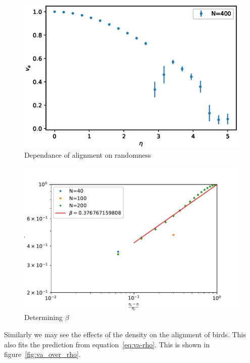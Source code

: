 \documentclass[twoside,twocolumn]{article}
\begin{document}
\begin{figure}[!htb]
  \centering
  \includegraphics[width=\columnwidth]{va_over_eta}
  \caption{Dependance of alignment on randomness}
  \label{fig:va_over_eta}
\end{figure}


\begin{figure}[!htb]
	\centering
	\includegraphics[width=\columnwidth]{va_over_etac_minus_eta_over_etac}
	\caption{Determining $\beta$}
  \label{fig:criticaleta}
\end{figure}

Similarly we may see the effects of the density on the alignment of birds. This also fits the prediction from equation~\eqref{eq:va-rho}. This is shown in figure~\ref{fig:va_over_rho}.
\end{document}
